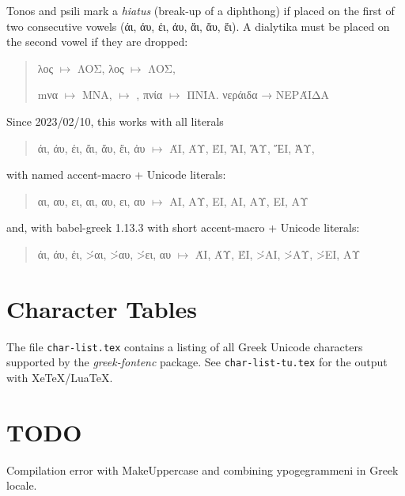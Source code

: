 \documentclass[a4paper]{scrartcl}
\newcommand{\Greek}{
  \ifdefined\extrasgreek
    \selectlanguage{greek}
  \fi
}
\begin{document}
Tonos and psili mark a \emph{hiatus} (break-up of a diphthong) if placed on
the first of two consecutive vowels (άι, άυ, έι, ἀυ, ἄι, ἄυ, ἔι).
A dialytika must be placed on the second vowel if they are dropped:
\begin{quote}
  \acctonos\textalpha\textupsilon λος $\mapsto$
  \MakeUppercase{\acctonos\textalpha\textupsilon λος},
  \accpsilioxia\textalpha\textupsilon λος $\mapsto$
  \MakeUppercase{\accpsilioxia\textalpha\textupsilon λος},

  m\acctonos\textalpha\textiota να $\mapsto$
  \MakeUppercase{m\acctonos\textalpha\textiota να},
  \textkappa\acctonos\textepsilon\textiota\textkappa $\mapsto$
  \MakeUppercase{\textkappa\acctonos\textepsilon\textiota\textkappa},
  \accpsili\textalpha\textupsilon πνία $\mapsto$
  \MakeUppercase{\accpsili\textalpha\textupsilon πνία}.
  νεράιδα → \MakeUppercase{νεράιδα}
\end{quote}
%
Since 2023/02/10, this works with all literals
\begin{quote}
  \Greek
  \newcommand*{\hiatest}{άι, άυ, έι, ἄι, ἄυ, ἔι, ἀυ}
  \hiatest{} $\mapsto$ \MakeUppercase{\hiatest},
\end{quote}
with named accent-macro + Unicode literals:
\begin{quote}
  \Greek
  \newcommand*{\hiatest}{
    \acctonos αι, \acctonos αυ, \acctonos ει,
    \accpsilioxia αι, \accpsilioxia αυ, \accpsilioxia ει, \accpsili αυ}
  \hiatest{} $\mapsto$ \MakeUppercase{\hiatest}
\end{quote}
and, with babel-greek 1.13.3 with short accent-macro + Unicode literals:
\begin{quote}
  \Greek
  \newcommand*{\hiatest}{
    \'αι, \'αυ, \'ει, \'>αι, \'>αυ, \'>ει, \>αυ}
  \hiatest{} $\mapsto$ \MakeUppercase{\hiatest}
\end{quote}

\section{Character Tables}

The file \texttt{char-list.tex} contains a listing of all Greek
Unicode characters supported by the \emph{greek-fontenc} package.
See \texttt{char-list-tu.tex} for the output with XeTeX/LuaTeX.

\section{TODO}

Compilation error with MakeUppercase and combining ypogegrammeni in Greek
locale.

%
\end{document}
